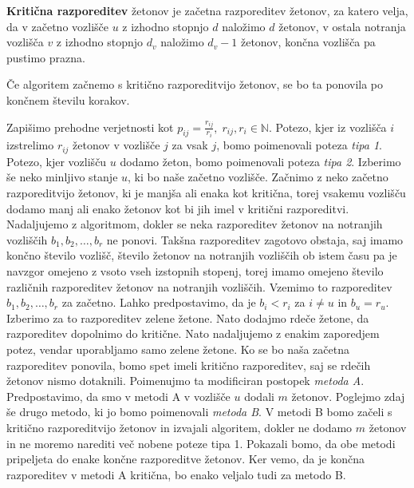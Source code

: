 \documentclass[twoside,11pt]{article}
\begin{document}
\begin{definicija}\label{kritična razporeditev}
    \textbf{Kritična razporeditev} žetonov je začetna razporeditev žetonov, za katero velja, da v začetno vozlišče $u$ z izhodno stopnjo $d$ naložimo $d$ žetonov, v ostala notranja vozlišča $v$ z izhodno stopnjo $d_{v}$ naložimo $d_{v} - 1$ žetonov, končna vozlišča pa pustimo prazna.
\end{definicija}

\begin{trditev}\label{končnost}
    Če algoritem začnemo s kritično razporeditvijo žetonov, se bo ta ponovila po končnem številu korakov.
\end{trditev}

 Zapišimo prehodne verjetnosti kot $p_{ij} = \frac{r_{ij}}{r_{i}},\; r_{ij}, r_{i}\in \mathbb{N}$. Potezo, kjer iz vozlišča $i$ izstrelimo $r_{ij}$ žetonov v vozlišče $j$ za vsak $j$, bomo poimenovali poteza \emph{tipa 1}. Potezo, kjer vozlišču $u$ dodamo žeton, bomo poimenovali poteza \emph{tipa 2}. Izberimo še neko minljivo stanje $u$, ki bo naše začetno vozlišče. Začnimo z neko začetno razporeditvijo žetonov, ki je manjša ali enaka kot kritična, torej vsakemu vozlišču dodamo manj ali enako žetonov kot bi jih imel v kritični razporeditvi. Nadaljujemo z algoritmom, dokler se neka razporeditev žetonov na notranjih vozliščih $b_{1},b_{2},\ldots,b_{r}$ ne ponovi. Takšna razporeditev zagotovo obstaja, saj imamo končno število vozlišč, število žetonov na notranjih vozliščih ob istem času pa je navzgor omejeno z vsoto vseh izstopnih stopenj, torej imamo omejeno število različnih razporeditev žetonov na notranjih vozliščih. Vzemimo to razporeditev $b_{1},b_{2},\ldots,b_{r}$ za začetno. Lahko predpostavimo, da je $b_{i}<r_{i}$ za $i \neq u$ in $b_{u} = r_{u}$. Izberimo za to razporeditev zelene žetone. Nato dodajmo rdeče žetone, da razporeditev dopolnimo do kritične. Nato nadaljujemo z enakim zaporedjem potez, vendar uporabljamo samo zelene žetone. Ko se bo naša začetna razporeditev ponovila, bomo spet imeli kritično razporeditev, saj se rdečih žetonov nismo dotaknili. Poimenujmo ta modificiran postopek \emph{metoda A}. 
Predpostavimo, da smo v metodi A v vozlišče $u$ dodali $m$ žetonov. Poglejmo zdaj še drugo metodo, ki jo bomo poimenovali \emph{metoda B}. V metodi B bomo začeli s kritično razporeditvijo žetonov in izvajali algoritem, dokler ne dodamo $m$ žetonov in ne moremo narediti več nobene poteze tipa 1. Pokazali bomo, da obe metodi pripeljeta do enake končne razporeditve žetonov. Ker vemo, da je končna razporeditev v metodi A kritična, bo enako veljalo tudi za metodo B. \newline
\end{document}
